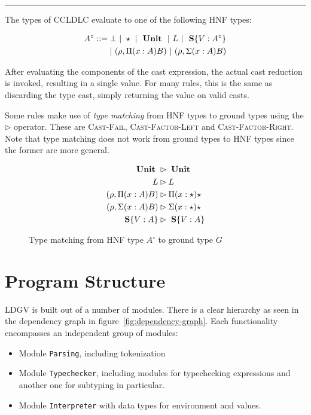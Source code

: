 \hrule\vspace{4ex}

The types of CCLDLC evaluate to one of the following HNF types:

\begin{equation}
\begin{split}
 A^\circ ::= \bot ~|~ \star ~|~ \text{ \textbf{Unit} } ~|~ L ~|~ \text{ \textbf{S}}\{V:A^\circ\} \\
 |~ (\rho, \Pi(x:A)B) ~|~ (\rho, \Sigma(x:A)B)
\end{split}
\end{equation}

After evaluating the components of the cast expression, the actual cast reduction is invoked, resulting in a single value. For many rules, this is the same as discarding the type cast, simply returning the value on valid casts.

Some rules make use of \emph{type matching} from HNF types to ground types using the $\rhd$ operator. These are \textsc{Cast-Fail}, \textsc{Cast-Factor-Left} and \textsc{Cast-Factor-Right}. Note that type matching does not work from ground types to HNF types since the former are more general.

\begin{figure}
\begin{align*}
\text{ \textbf{Unit} } &\rhd \text{ \textbf{Unit} } \\
L &\rhd L \\
(\rho, \Pi (x:A)B) &\rhd \Pi(x:\star)\star \\
(\rho, \Sigma (x:A)B) &\rhd \Sigma(x:\star)\star \\
\text{ \textbf{S}} \{ V:A \} &\rhd \text{ \textbf{S}} \{ V : A \}
\end{align*}
\caption{Type matching from HNF type $A^\circ$ to ground type $G$}
\label{fig:ccldlc-type-matching}
\end{figure}

\section{Program Structure}\label{sec:program-structure}

LDGV is built out of a number of modules. There is a clear hierarchy as seen in the dependency graph in figure~\ref{fig:dependency-graph}. Each functionality encompasses an independent group of modules:

\begin{itemize}
 \item Module \texttt{Parsing}, including tokenization
 \item Module \texttt{Typechecker}, including modules for typechecking expressions and another one for subtyping in particular.
 \item Module \texttt{Interpreter} with data types for environment and values.
\end{itemize}

